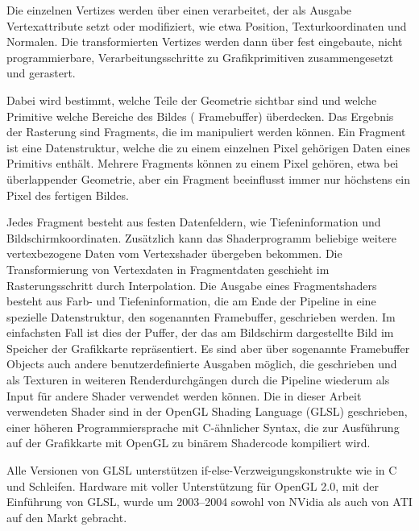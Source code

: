 Die einzelnen Vertizes werden über einen 
verarbeitet, der als Ausgabe Vertexattribute setzt oder modifiziert,
wie etwa Position, Texturkoordinaten und Normalen. Die transformierten
Vertizes werden dann über fest eingebaute, \Pimiddydh{} nicht
programmierbare, Verarbeitungsschritte zu Grafikprimitiven
zusammengesetzt und gerastert.

Dabei wird bestimmt, welche Teile der Geometrie sichtbar sind und
welche Primitive welche Bereiche des Bildes (\PimiddyzB{} Framebuffer)
überdecken. Das Ergebnis der Rasterung sind Fragments, die im
 manipuliert werden können. Ein
Fragment ist eine Datenstruktur, welche die zu einem einzelnen Pixel
gehörigen Daten eines Primitivs enthält. Mehrere Fragments können zu
einem Pixel gehören, etwa bei überlappender Geometrie, aber ein
Fragment beeinflusst immer nur höchstens ein Pixel des fertigen
Bildes.

Jedes Fragment besteht aus festen Datenfeldern, wie Tiefeninformation
und Bildschirmkoordinaten. Zusätzlich kann das Shaderprogramm
beliebige weitere vertexbezogene Daten vom Vertexshader übergeben
bekommen. Die Transformierung von Vertexdaten in Fragmentdaten
geschieht im Rasterungsschritt durch Interpolation. Die Ausgabe eines
Fragmentshaders besteht aus Farb- und Tiefeninformation, die am Ende
der Pipeline in eine spezielle Datenstruktur, den sogenannten
Framebuffer, geschrieben werden. Im einfachsten Fall ist dies der
Puffer, der das am Bildschirm dargestellte Bild im Speicher der
Grafikkarte repräsentiert. Es sind aber über sogenannte Framebuffer
Objects auch andere benutzerdefinierte Ausgaben möglich, die
geschrieben und \PimiddyzB{} als Texturen in weiteren Renderdurchgängen
durch die Pipeline wiederum als Input für andere Shader verwendet
werden können.  Die in dieser Arbeit verwendeten Shader sind in der
OpenGL Shading Language (GLSL) geschrieben, einer höheren
Programmiersprache mit C-ähnlicher Syntax, die zur Ausführung auf der
Grafikkarte mit OpenGL zu binärem Shadercode kompiliert wird.

Alle Versionen von GLSL unterstützen if-else-Verzweigungskonstrukte
wie in C und Schleifen.  Hardware mit voller Unterstützung für OpenGL
2.0, mit der Einführung von GLSL, wurde um 2003--2004 sowohl von NVidia
als auch von ATI auf den Markt gebracht.
